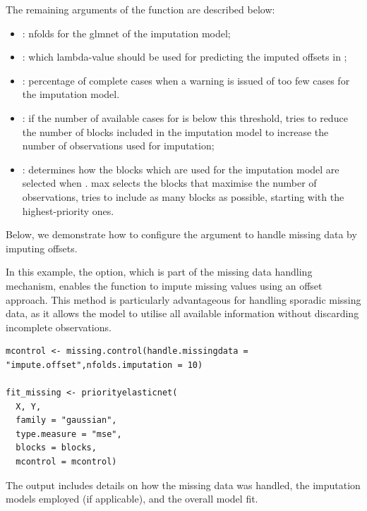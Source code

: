 The remaining arguments of the  function are described below:
\begin{itemize}
    \item {}: nfolds for the glmnet of the imputation model;

    \item {}: which lambda-value should be used for predicting the imputed offsets in ;

    \item {}:	percentage of complete cases when a warning is issued of too few cases for the imputation model.

    \item {}: if the number of available cases for  is below this threshold,  tries to reduce the number of blocks included in the imputation model to increase the number of observations used for imputation;

    \item {}: determines how the blocks which are used for the imputation model are selected when . max selects the blocks that maximise the number of observations,  tries to include as many blocks as possible, starting with the highest-priority ones.
\end{itemize}

Below, we demonstrate how to configure the  argument to handle missing data by imputing offsets. 

In this example, the  option, which is part of the missing data handling mechanism, enables the  function to impute missing values using an offset approach. This method is particularly advantageous for handling sporadic missing data, as it allows the model to utilise all available information without discarding incomplete observations.
{\small
\begin{verbatim}
mcontrol <- missing.control(handle.missingdata = "impute.offset",nfolds.imputation = 10)

fit_missing <- priorityelasticnet(
  X, Y,
  family = "gaussian",
  type.measure = "mse",
  blocks = blocks,
  mcontrol = mcontrol)
\end{verbatim}
}
The output includes details on how the missing data was handled, the imputation models employed (if applicable), and the overall model fit. 

